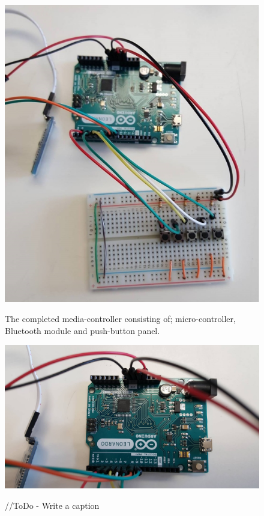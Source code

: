 \documentclass{article}
\begin{document}
	\begin{figure}[]
		\centering
		\label{fullSystem}
		{\includegraphics[scale = 0.5]{fullSystem}}
		\caption{The completed media-controller consisting of; micro-controller, Bluetooth module and push-button panel.}
	\end{figure}
	
	\begin{figure}[]
		\centering
		\label{leonardo}
		{\includegraphics[scale = 0.15]{leonardo}}
		\caption{//ToDo - Write a caption}
	\end{figure}
	
\end{document}
